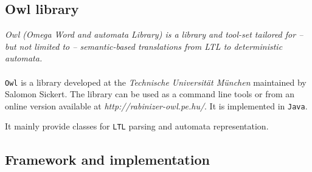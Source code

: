\documentclass[letterpaper]{article}
\theoremstyle{definition}
\begin{document}
%
%
%

\subsection{Owl library}

\label{sec:owl}

\textit{Owl (Omega Word and automata Library)
is a library and tool-set tailored for – but not
limited to – semantic-based translations
from LTL to deterministic automata.}

\paragraph{}

\texttt{Owl} is a library developed at the
\textit{Technische Universität München}
maintained by Salomon Sickert.
The library can be used as a command line tools or from an
online version available at \textit{http://rabinizer-owl.pe.hu/}.
It is implemented in \texttt{Java}.

It mainly provide classes for \texttt{LTL} parsing
and automata representation.


\subsection{Framework and implementation}
\end{document}
